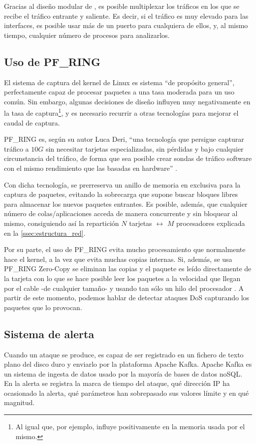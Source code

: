 Gracias al diseño modular de \redborderddos, es posible multiplexar los tráficos en los
que se recibe el tráfico entrante y saliente. Es decir, si el tráfico es muy elevado para
las interfaces, es posible usar más de un puerto para cualquiera de ellos, y, al mismo tiempo,
cualquier número de procesos para analizarlos.

\subsection{Uso de PF\_RING}
El sistema de captura del kernel de Linux es sistema ``de propósito general'', perfectamente capaz de
procesar paquetes a una tasa moderada para un uso común. Sin embargo,
algunas decisiones de diseño influyen muy negativamente en la tasa de captura\footnote{Al igual que,
por ejemplo, influye positivamente en la memoria usada por el mismo.}, y es necesario recurrir
a otras tecnologías para mejorar el caudal de captura.

PF\_RING es, según su autor Luca Deri, ``una tecnología que
persigue capturar tráfico a $10G$ sin necesitar tarjetas especializadas, sin pérdidas y bajo cualquier
circunstancia del tráfico, de forma que sea posible crear sondas de tráfico software con el mismo
rendimiento que las basadas en hardware'' \cite{LucaDeriPFRING}.

Con dicha tecnología, se prerreserva un anillo de memoria en exclusiva para la captura de paquetes,
evitando la sobrecarga que supone buscar bloques libres para almacenar los nuevos paquetes entrantes.
Es posible, además, que cualquier número de colas/aplicaciones acceda de manera concurrente y sin bloquear al mismo,
consiguiendo así la repartición $N$ tarjetas $\leftrightarrow$ $M$ procesadores explicada en
la \autoref{ssec:estructura_red}.

Por su parte, el uso de PF\_RING evita mucho procesamiento que normalmente hace el kernel, a la vez que evita
muchas copias internas. Si, además, se usa PF\_RING Zero-Copy se eliminan las copias y el paquete es leído
directamente de la tarjeta con lo que se hace posible leer los paquetes a la velocidad que llegan por
el cable -de cualquier tamaño- y usando tan sólo un hilo del procesador \cite{PFRingZc}. A partir de este momento,
podemos hablar de detectar ataques \gls{DoS} capturando los paquetes que lo provocan.

\subsection{Sistema de alerta}
Cuando un ataque se produce, \redborderddos{} es capaz de ser registrado en un fichero de texto
plano del disco duro y enviarlo por la plataforma Apache Kafka.
Apache Kafka es un sistema
de ingesta de datos usado por la mayoría de bases de datos noSQL. En la 
alerta se registra la marca de tiempo del ataque, qué dirección IP ha ocasionado la alerta,
qué parámetros han sobrepasado sus valores límite y en qué magnitud.

